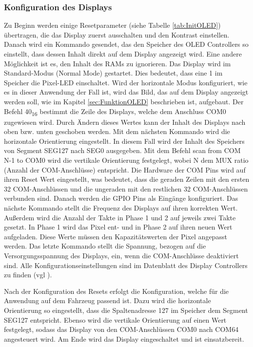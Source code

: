 \subsubsection{Konfiguration des Displays}
Zu Beginn werden einige Resetparameter (siehe Tabelle \ref{tab:InitOLED}) übertragen, die das Display zuerst ausschalten und den Kontrast einstellen. Danach wird ein Kommando gesendet, das den Speicher des \ac{OLED} Controllers so einstellt, dass dessen Inhalt direkt auf dem Display angezeigt wird. Eine andere Möglichkeit ist es, den Inhalt des \ac{RAM}s zu ignorieren. Das Display wird im Standard-Modus (Normal Mode) gestartet. Dies bedeutet, dass eine 1 im Speicher die Pixel-LED einschaltet. Wird der horizontale Modus konfiguriert, wie es in dieser Anwendung der Fall ist, wird das Bild, das auf dem Display angezeigt werden soll, wie im Kapitel \ref{sec:FunktionOLED} beschrieben ist, aufgebaut. Der Befehl 40\textsubscript{16} bestimmt die Zeile des Displays, welche dem Anschluss COM0 zugewiesen wird. Durch Ändern dieses Wertes kann der Inhalt des Displays nach oben bzw. unten geschoben werden. Mit dem nächsten Kommando wird die horizontale Orientierung eingestellt. In diesem Fall wird der Inhalt des Speichers von Segment SEG127 nach SEG0 ausgegeben. Mit dem Befehl \glqq scan from COM N-1 to COM0\grqq{} wird die vertikale Orientierung festgelegt, wobei N dem \glqq MUX ratio\grqq{} (Anzahl der COM-Anschlüsse) entspricht. Die Hardware der COM Pins wird auf ihren Reset Wert eingestellt, was bedeutet, dass die geraden Zeilen mit den ersten 32 COM-Anschlüssen und die ungeraden mit den restlichen 32 COM-Anschlüssen verbunden sind. Danach werden die GPIO Pins als Eingänge konfiguriert. Das nächste Kommando stellt die Frequenz des Displays auf ihren korrekten Wert. Außerdem wird die Anzahl der Takte in Phase 1 und 2 auf jeweils zwei Takte gesetzt. In Phase 1 wird das Pixel ent- und in Phase 2 auf ihren neuen Wert aufgeladen. Diese Werte müssen den Kapazitätswerten der Pixel angepasst werden. Das letzte Kommando stellt die Spannung, bezogen auf die Versorgungsspannung des Displays, ein, wenn die COM-Anschlüsse deaktiviert sind. Alle Konfigurationseinstellungen sind im Datenblatt des Display Controllers zu finden (vgl \cite{SSD1309}).\vspace{11pt}

Nach der Konfiguration des Resets erfolgt die Konfiguration, welche für die Anwendung auf dem Fahrzeug passend ist. Dazu wird die horizontale Orientierung so eingestellt, dass die Spaltenadresse 127 im Speicher dem Segment SEG127 entspricht. Ebenso wird die vertikale Orientierung auf einen Wert festgelegt, sodass das Display von den COM-Anschlüssen COM0 nach COM64 angesteuert wird. Am Ende wird das Display eingeschaltet und ist einsatzbereit.

